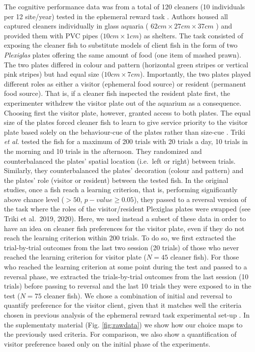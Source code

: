 \documentclass[]{rsos}%
\begin{document}
The cognitive performance data was from a total of 120 cleaners
(10 individuals per 12 site/year) tested in the
ephemeral reward task \citep{triki_Biological_2019, triki_Brain_2020}. Authors
housed all captured cleaners individually in glass aquaria
( \(62cm \times 27cm \times 37 cm\) ) and provided them
with PVC pipes (\(10 cm \times 1 cm\)) as shelters.
The task consisted of exposing the cleaner fish to substitute
models of client fish in the form of two \emph{Plexiglas} plates offering the
same amount of food (one item of mashed prawn). The two plates differed
in colour and pattern (horizontal green stripes or vertical pink stripes)
but had equal size (\(10 cm \times 7 cm\)). Importantly, the two plates played
different roles as either a visitor (ephemeral food source) or
resident (permanent food source). That is, if a cleaner fish inspected the
resident plate first, the experimenter withdrew the visitor plate out of
the aquarium as a consequence. Choosing first the visitor plate,
however, granted access to both plates. The equal size of the plates
forced cleaner fish to learn to give service priority to the visitor plate
based solely on the behaviour-cue of the plates rather than size-cue
\citep{wismer_Cuebased_2019}. Triki \emph{et al.} \citep{triki_Biological_2019, triki_Brain_2020}
tested the fish for a maximum of 200 trials with 20 trials a day, 10 trials
in the morning and 10 trials in the afternoon. They randomized and
counterbalanced the plates' spatial location (i.e.~left or right)
between trials. Similarly, they counterbalanced the plates' decoration
(colour and pattern) and the plates' role (visitor or resident) between the
tested fish. In the original studies, once a fish reach a learning criterion,
that is, performing significantly above chance level (\(> 50%
\), \(p-value ≥ 0.05\)),
they passed to a reversal version of the task where the roles of the
visitor/resident Plexiglas plates were swapped (see Triki et al.~2019, 2020).
Here, we used instead a subset of these data in order to have an idea on
cleaner fish preferences for the visitor plate, even if they do not reach
the learning criterion within 200 trials. To do so, we first extracted the
trial-by-trial outcomes from the last two session (20 trials) of those who
never reached the learning criterion for visitor plate
(\(N = 45\) cleaner fish).
For those who reached the learning criterion at some point during the
test and passed to a reversal phase, we extracted the trials-by-trial
outcomes from the last session (10 trials) before passing to reversal
and the last 10 trials they were exposed to in the test
(\(N = 75\) cleaner fish).
We chose a combination of initial and reversal to quantify preference
for the visitor client, given that it matches well the criteria chosen
in previous analysis of the ephemeral reward task experimental set-up
\citep{triki_Biological_2019, triki_Brain_2020}. In the
suplementaty material (Fig. \ref{fig:rawdata}) we show how our choice maps
to the previously used criteria. For comparison, we also show a quantification
of visitor preference based only on the initial phase of the experiments.
\end{document}
